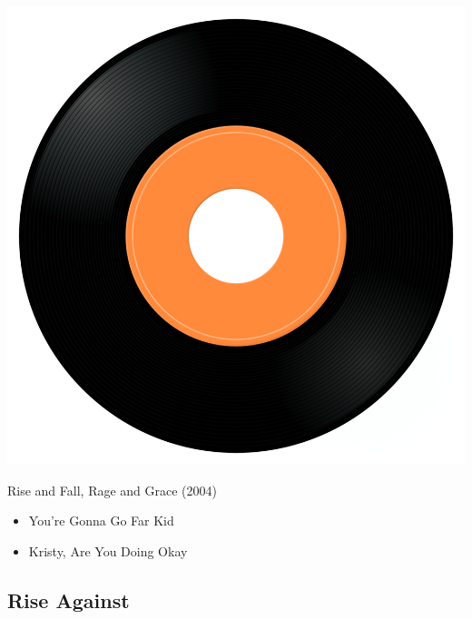 \begin{minipage}[t]{0.25\textwidth}
\captionsetup{type=figure}
\includegraphics[width=\textwidth]{Images/cover.png}
\caption*{Rise and Fall, Rage and Grace  (2004)}
\end{minipage}
\begin{minipage}[t]{0.25\textwidth}\vspace{0pt}
\begin{itemize}[nosep,leftmargin=1em,labelwidth=*,align=left]
	\setlength{\itemsep}{0pt}
	\item You're Gonna Go Far Kid
	\item Kristy, Are You Doing Okay 
\end{itemize}
\end{minipage}

\subsection{Rise Against}

